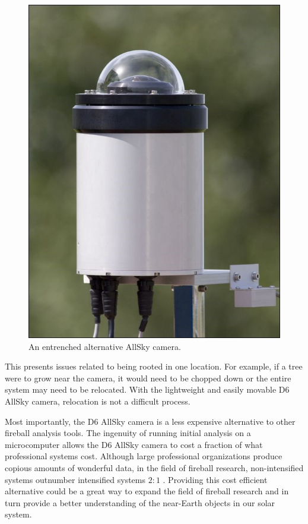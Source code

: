 \begin{figure}[ht!]
  \centering
  \includegraphics[scale=0.3]{images/othercam.jpg}
  \caption{An entrenched alternative AllSky camera.}
  \label{immobile}
\end{figure}

This presents issues related to being rooted in one location.
For example, if a tree were to grow near the camera, it would need to be chopped down or the entire system may need to be relocated.
With the lightweight and easily movable D6 AllSky camera, relocation is not a difficult process.

Most importantly, the D6 AllSky camera is a less expensive alternative to other fireball analysis tools.  
The ingenuity of running initial analysis on a microcomputer allows the D6 AllSky camera to cost a fraction of what professional systems cost.
Although large professional organizations produce copious amounts of wonderful data, in the field of fireball research, non-intensified systems outnumber intensified systems $2:1$ \cite{gural_review_2005}.  
Providing this cost efficient alternative could be a great way to expand the field of fireball research and in turn provide a better understanding of the near-Earth objects in our solar system.






